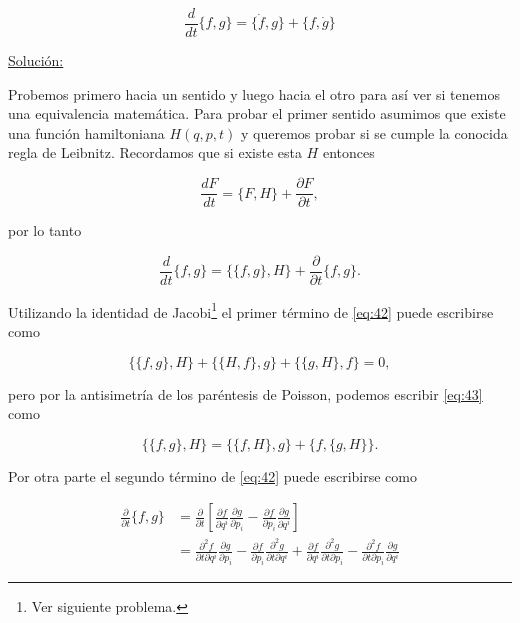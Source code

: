 \documentclass[a4paper,10pt]{article}
\numberwithin{equation}{section}
\begin{document}
$$
\frac{d}{dt}\{f,g\} = \{\dot{f},g\} + \{f,\dot{g}\}
$$

\vspace{.3cm}

\underline{Solución:} \vspace{.3cm}

Probemos primero hacia un sentido y luego hacia el otro para así ver si tenemos una equivalencia 
matemática. Para probar el primer sentido asumimos que existe una función hamiltoniana 
$H(q,p,t)$ y queremos probar si se cumple la conocida regla de Leibnitz. Recordamos 
que si existe esta $H$ entonces 

\begin{equation}
 \frac{dF}{dt} = \{F,H\} + \frac{\partial F}{\partial t},
 \label{eq:41}
\end{equation}

por lo tanto

\begin{equation}
 \frac{d}{dt}\{f,g\} = \{\{f,g\},H\} + \frac{\partial}{\partial t}\{f,g\}.
 \label{eq:42}
\end{equation}

Utilizando la identidad de Jacobi\footnote{Ver siguiente problema.} el primer término 
de \eqref{eq:42} puede escribirse como

\begin{equation}
 \{\{f,g\},H\} +  \{\{H,f\},g\} +  \{\{g,H\},f\} = 0,
 \label{eq:43}
\end{equation}

pero por la antisimetría de los paréntesis de Poisson, podemos escribir \eqref{eq:43} 
como

\begin{equation}
  \{\{f,g\},H\} = \{\{f,H\},g\} + \{f,\{g,H\}\}.
 \label{eq:44}
\end{equation}

Por otra parte el segundo término de \eqref{eq:42} puede escribirse como 

\begin{align*}
 \frac{\partial}{\partial t}\{f,g\} &= \frac{\partial}{\partial t}
 \left[\frac{\partial f}{\partial q^i}\frac{\partial g}{\partial p_i} - 
 \frac{\partial f}{\partial p_i}\frac{\partial g}{\partial q^i}\right] \\
 &= \frac{\partial^2 f}{\partial t\partial q^i}\frac{\partial g}{\partial p_i} 
 - \frac{\partial f}{\partial p_i}\frac{\partial^2 g}{\partial t \partial q^i}
 + \frac{\partial f}{\partial q^i}\frac{\partial^2 g}{\partial t \partial p_i}
 - \frac{\partial^2 f}{\partial t\partial p_i}\frac{\partial g}{\partial q^i} 
\end{align*}
\end{document}
